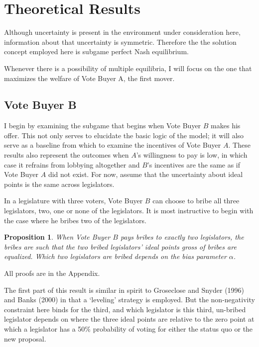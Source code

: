 \documentclass[12pt]{article}
\newtheorem{proposition}{Proposition}
\newcommand{\al}{\alpha}
\begin{document}
\section{Theoretical Results}
\label{sec:res}

Although uncertainty is present in the environment under consideration here, information about that uncertainty is symmetric. Therefore the the solution concept employed here is subgame perfect Nash equilibrium.

Whenever there is a possibility of multiple equilibria, I will focus on the one that maximizes the welfare of Vote Buyer A, the first mover.


\subsection{Vote Buyer B}
\label{sec:resB}

I begin by examining the subgame that begins when Vote Buyer $B$ makes his offer. This not only serves to elucidate the basic logic of the model; it will also serve as a baseline from which to examine the incentives of Vote Buyer $A$. These results also represent the outcomes when $A$'s willingness to pay is low, in which case it refrains from lobbying altogether and $B$'s incentives are the same as if Vote Buyer $A$ did not exist. For now, assume that the uncertainty about ideal points is the same across legislators.

In a legislature with three voters, Vote Buyer $B$ can choose to bribe all three legislators, two, one or none of the legislators. It is most instructive to begin with the case where he bribes two of the legislators.

\begin{proposition}
  When Vote Buyer $B$ pays bribes to exactly two legislators, the bribes are such that the two bribed legislators' ideal points gross of bribes are equalized. Which two legislators are bribed depends on the bias parameter $\al$.
	\label{prop:2NNB}
\end{proposition}

All proofs are in the Appendix.

The first part of this result is similar in spirit to Groseclose and Snyder (1996) and Banks (2000) in that a `leveling' strategy is employed. But the non-negativity constraint here binds for the third, and which legislator is this third, un-bribed legislator depends on where the three ideal points are relative to the zero point at which a legislator has a 50$\%$ probability of voting for either the status quo or the new proposal.
\end{document}

